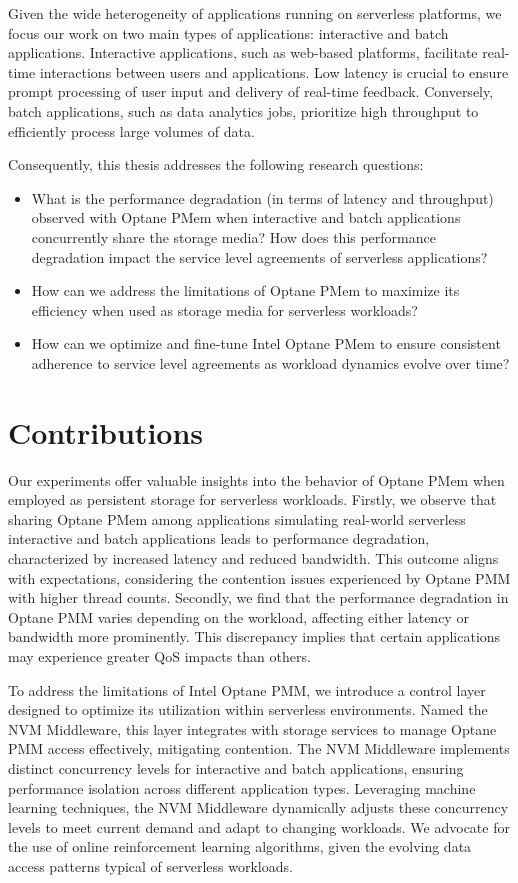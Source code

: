 Given the wide heterogeneity of applications running on serverless platforms, we focus our work on two main types of applications: interactive and batch applications. Interactive applications, such as web-based platforms, facilitate real-time interactions between users and applications. Low latency is crucial to ensure prompt processing of user input and delivery of real-time feedback. Conversely, batch applications, such as data analytics jobs, prioritize high throughput to efficiently process large volumes of data.

Consequently, this thesis addresses the following research questions:

\begin{itemize}
    \item What is the performance degradation (in terms of latency and throughput) observed with Optane PMem when interactive and batch applications concurrently share the storage media? How does this performance degradation impact the service level agreements of serverless applications?
    \item How can we address the limitations of Optane PMem to maximize its efficiency when used as storage media for serverless workloads?
    \item How can we optimize and fine-tune Intel Optane PMem to ensure consistent adherence to service level agreements as workload dynamics evolve over time?
\end{itemize}

\section{Contributions}

Our experiments offer valuable insights into the behavior of Optane PMem when employed as persistent storage for serverless workloads. Firstly, we observe that sharing Optane PMem among applications simulating real-world serverless interactive and batch applications leads to performance degradation, characterized by increased latency and reduced bandwidth. This outcome aligns with expectations, considering the contention issues experienced by Optane PMM with higher thread counts. Secondly, we find that the performance degradation in Optane PMM varies depending on the workload, affecting either latency or bandwidth more prominently. This discrepancy implies that certain applications may experience greater QoS impacts than others.

To address the limitations of Intel Optane PMM, we introduce a control layer designed to optimize its utilization within serverless environments. Named the NVM Middleware, this layer integrates with storage services to manage Optane PMM access effectively, mitigating contention. The NVM Middleware implements distinct concurrency levels for interactive and batch applications, ensuring performance isolation across different application types. Leveraging machine learning techniques, the NVM Middleware dynamically adjusts these concurrency levels to meet current demand and adapt to changing workloads. We advocate for the use of online reinforcement learning algorithms, given the evolving data access patterns typical of serverless workloads.

